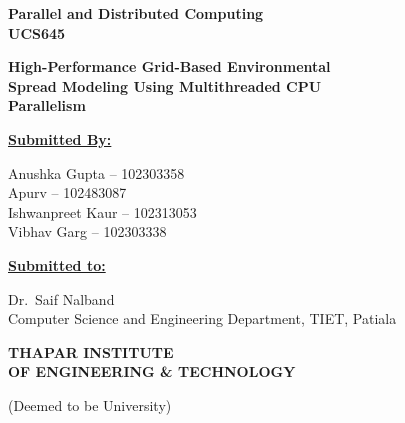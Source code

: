 \documentclass[12pt,a4paper]{article}
\begin{document}
\begin{titlepage}
    \centering
    \vspace*{1cm}

    {\LARGE\bfseries Parallel and Distributed Computing\\[0.3em]
    UCS645\par}

    \vspace{1.5cm}

    {\Large\bfseries High-Performance Grid-Based Environmental\\
    Spread Modeling Using Multithreaded CPU\\
    Parallelism\par}

    \vspace{2cm}

    {\large\bfseries\underline{Submitted By:}\par}
    \vspace{0.5cm}
    {\large
    Anushka Gupta -- 102303358\\
    Apurv -- 102483087\\
    Ishwanpreet Kaur -- 102313053\\
    Vibhav Garg -- 102303338\par}

    \vspace{1.5cm}

    {\large\bfseries\underline{Submitted to:}\par}
    \vspace{0.3cm}
    {\large
    Dr.\ Saif Nalband\\
    Computer Science and Engineering Department, TIET, Patiala\par}

    \vspace{2cm}

    {\Large\bfseries THAPAR INSTITUTE\\
    OF ENGINEERING \& TECHNOLOGY\\[0.2em]}
    {\normalsize (Deemed to be University)\par}

    \vfill
\end{titlepage}

\end{document}

